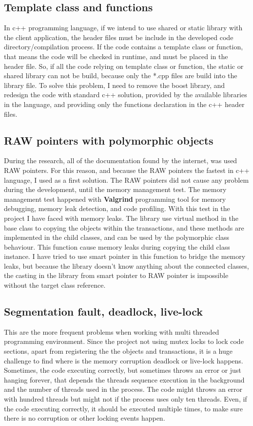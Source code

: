 \documentclass[12pt]{article}
\begin{document}
\subsection{Template class and functions}
In c++ programming language, if we intend to use shared or static library with the client application, the header files must be include in the developed code directory/compilation process. If the code contains a template class or function, that means the code will be checked in runtime, and must be placed in the header file. So, if all the code relying on template class or function, the static or shared library can not be build, because only the *.cpp files are build into the library file. To solve this problem, I need to remove the boost library, and redesign the code with standard c++ solution, provided by the available libraries in the  language, and providing only the functions declaration in the c++ header files.

\subsection{RAW pointers with polymorphic objects}
During the research, all of the documentation found by the internet, was used RAW pointers. For this reason, and because the RAW pointers the fastest in c++ language, I used as a first solution. The RAW pointers did not cause any problem during the development, until the memory management test. The memory management test happened with \textbf{Valgrind} programming tool for memory debugging, memory leak detection, and code profiling. With this test in the project I have faced with memory leaks. The library use virtual method in the base class to copying the objects within the transactions, and these methods are implemented in the child classes, and can be used by the polymorphic class behaviour. This function cause memory leaks during copying the child class instance. I have tried to use smart pointer in this function to bridge the memory leaks, but because the library doesn't know anything about the connected classes, the casting in the library from smart pointer to RAW pointer is impossible without the target class reference.

\subsection{Segmentation fault, deadlock, live-lock}
This are the more frequent problems when working with multi threaded programming environment. Since the project not using mutex locks to lock code sections, apart from registering the the objects and transactions, it is a huge challenge to find where is the memory corruption deadlock or live-lock happens. Sometimes, the code executing correctly, but sometimes throws an error or just hanging forever, that depends the threads sequence execution in the background and the number of threads used in the process. The code might throws an error with hundred threads but might not if the process uses only ten threads. Even, if the code executing correctly, it should be executed multiple times, to make sure there is no corruption or other locking events happen.\\
\end{document}
